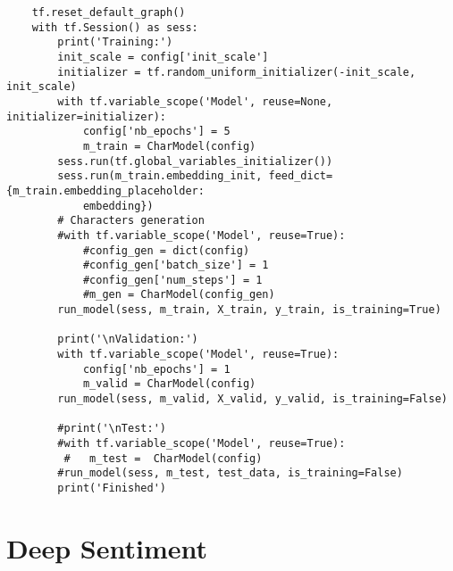 \begin{lstlisting}
    tf.reset_default_graph()
    with tf.Session() as sess:
        print('Training:')
        init_scale = config['init_scale']
        initializer = tf.random_uniform_initializer(-init_scale, init_scale)    
        with tf.variable_scope('Model', reuse=None, initializer=initializer):
            config['nb_epochs'] = 5
            m_train = CharModel(config)
        sess.run(tf.global_variables_initializer())
        sess.run(m_train.embedding_init, feed_dict={m_train.embedding_placeholder: 
            embedding})
        # Characters generation
        #with tf.variable_scope('Model', reuse=True):
            #config_gen = dict(config)
            #config_gen['batch_size'] = 1
            #config_gen['num_steps'] = 1
            #m_gen = CharModel(config_gen)
        run_model(sess, m_train, X_train, y_train, is_training=True)
        
        print('\nValidation:')
        with tf.variable_scope('Model', reuse=True):
            config['nb_epochs'] = 1
            m_valid = CharModel(config)
        run_model(sess, m_valid, X_valid, y_valid, is_training=False)
        
        #print('\nTest:')
        #with tf.variable_scope('Model', reuse=True):
         #   m_test =  CharModel(config)
        #run_model(sess, m_test, test_data, is_training=False)
        print('Finished')
\end{lstlisting}

\section{Deep Sentiment}


